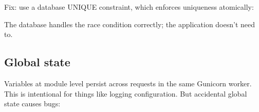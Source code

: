 \noindent{}Fix: use a database UNIQUE constraint, which enforces uniqueness atomically:

\begin{codebox}[short]

\begin{Shaded}
\begin{Highlighting}[]
  
\end{Highlighting}
\end{Shaded}

\end{codebox}

\begin{codebox}[short]

\begin{Shaded}
\begin{Highlighting}[]
\NormalTok{:}
    \NormalTok{: }\NormalTok{\}), }
\end{Highlighting}
\end{Shaded}

\end{codebox}

\noindent{}The database handles the race condition correctly; the application doesn't need to.

\subsection*{Global state}\label{39-local-vs-production:global-state}

Variables at module level persist across requests in the same Gunicorn worker. This is intentional for things like logging configuration. But accidental global state causes bugs:

